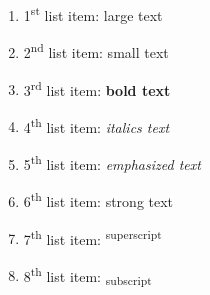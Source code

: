 \documentclass[12pt]{article}
\begin{document}
\begin{enumerate}
    \item 1\textsuperscript{st} list item: {\Large large text}

    \item 2\textsuperscript{nd} list item: {\scriptsize small text}

    \item 3\textsuperscript{rd} list item: \textbf{bold text}

    \item 4\textsuperscript{th} list item: \textit{italics text}

    \item 5\textsuperscript{th} list item: \emph{emphasized text}

    \item 6\textsuperscript{th} list item: \textmd{strong text}

    \item 7\textsuperscript{th} list item: \textsuperscript{superscript}

    \item 8\textsuperscript{th} list item: \textsubscript{subscript}

\end{enumerate}
\end{document}
